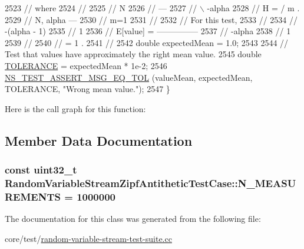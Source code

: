 \begin{DoxyCode}
2523   \textcolor{comment}{// where}
2524   \textcolor{comment}{//}
2525   \textcolor{comment}{//                    N   }
2526   \textcolor{comment}{//                   ---    }
2527   \textcolor{comment}{//                   \(\backslash\)     -alpha}
2528   \textcolor{comment}{//     H          =  /    m        .}
2529   \textcolor{comment}{//      N, alpha     ---}
2530   \textcolor{comment}{//                   m=1    }
2531   \textcolor{comment}{//                 }
2532   \textcolor{comment}{// For this test,}
2533   \textcolor{comment}{//}
2534   \textcolor{comment}{//                      -(alpha - 1)}
2535   \textcolor{comment}{//                     1}
2536   \textcolor{comment}{//     E[value]  =  ---------------}
2537   \textcolor{comment}{//                      -alpha}
2538   \textcolor{comment}{//                     1}
2539   \textcolor{comment}{//}
2540   \textcolor{comment}{//               =  1  .}
2541   \textcolor{comment}{//               }
2542   \textcolor{keywordtype}{double} expectedMean = 1.0;
2543 
2544   \textcolor{comment}{// Test that values have approximately the right mean value.}
2545   \textcolor{keywordtype}{double} \hyperlink{spectrum-value-test_8cc_a30c17564229ec2e37dfea9c6c9ad643e}{TOLERANCE} = expectedMean * 1e-2;
2546   \hyperlink{group__testing_ga9e7861b56b4e70db3b56044cb7a28e41}{NS\_TEST\_ASSERT\_MSG\_EQ\_TOL} (valueMean, expectedMean, TOLERANCE, \textcolor{stringliteral}{"Wrong mean
       value."}); 
2547 \}
\end{DoxyCode}


Here is the call graph for this function\+:




\subsection{Member Data Documentation}
\subsubsection[{\texorpdfstring{N\+\_\+\+M\+E\+A\+S\+U\+R\+E\+M\+E\+N\+TS}{N_MEASUREMENTS}}]{\setlength{\rightskip}{0pt plus 5cm}const uint32\+\_\+t Random\+Variable\+Stream\+Zipf\+Antithetic\+Test\+Case\+::\+N\+\_\+\+M\+E\+A\+S\+U\+R\+E\+M\+E\+N\+TS = 1000000\hspace{0.3cm}{\ttfamily [static]}}\hypertarget{classRandomVariableStreamZipfAntitheticTestCase_aa6e592d5004d13804492847b87c51adb}{}\label{classRandomVariableStreamZipfAntitheticTestCase_aa6e592d5004d13804492847b87c51adb}


The documentation for this class was generated from the following file\+:\begin{DoxyCompactItemize}
\item 
core/test/\hyperlink{random-variable-stream-test-suite_8cc}{random-\/variable-\/stream-\/test-\/suite.\+cc}\end{DoxyCompactItemize}
